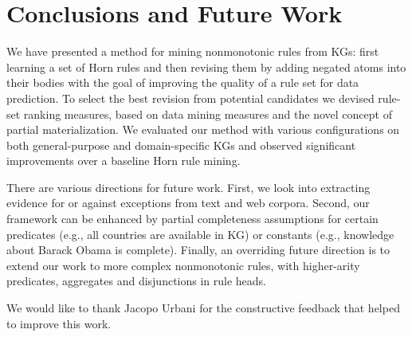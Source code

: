 \chapter{Conclusions and Future Work}\label{sec:concl}
We have presented a method for mining nonmonotonic rules from KGs: first learning a set of Horn rules  and
then revising them by adding negated atoms into their bodies with the goal of
improving the quality of a rule set for data prediction.
To select the best
revision from potential candidates we devised rule-set ranking
measures, based on data mining measures and the novel
concept of partial materialization.
We evaluated our method with various
configurations on both general-purpose and domain-specific KGs and observed significant
improvements over a baseline Horn rule mining.

There are various directions for future work. First, we look
into extracting evidence for or against exceptions from
text and web corpora.
 Second, our framework
can be enhanced by partial completeness assumptions
for certain
predicates (e.g., all countries are available in KG) or constants (e.g.,
knowledge about Barack Obama is complete).
Finally, an overriding future direction is to extend our
work to more complex nonmonotonic rules, with
higher-arity predicates, aggregates and disjunctions in
rule heads.

 We would like to thank Jacopo Urbani for the constructive feedback that helped to improve this work.
